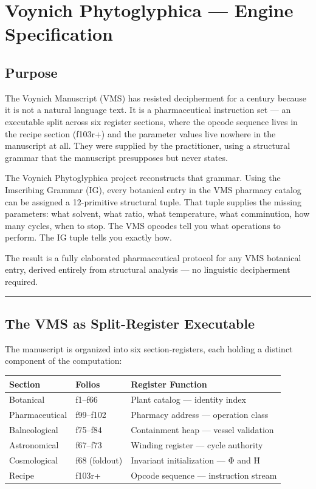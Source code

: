 \hypertarget{voynich-phytoglyphica-engine-specification}{%
\section{Voynich Phytoglyphica --- Engine
Specification}\label{voynich-phytoglyphica-engine-specification}}

\hypertarget{purpose}{%
\subsection{Purpose}\label{purpose}}

The Voynich Manuscript (VMS) has resisted decipherment for a century
because it is not a natural language text. It is a pharmaceutical
instruction set --- an executable split across six register sections,
where the opcode sequence lives in the recipe section (f103r+) and the
parameter values live nowhere in the manuscript at all. They were
supplied by the practitioner, using a structural grammar that the
manuscript presupposes but never states.

The Voynich Phytoglyphica project reconstructs that grammar. Using the
Imscribing Grammar (IG), every botanical entry in the VMS pharmacy
catalog can be assigned a 12-primitive structural tuple. That tuple
supplies the missing parameters: what solvent, what ratio, what
temperature, what comminution, how many cycles, when to stop. The VMS
opcodes tell you what operations to perform. The IG tuple tells you
exactly how.

The result is a fully elaborated pharmaceutical protocol for any VMS
botanical entry, derived entirely from structural analysis --- no
linguistic decipherment required.

\begin{center}\rule{0.5\linewidth}{0.5pt}\end{center}

\hypertarget{the-vms-as-split-register-executable}{%
\subsection{The VMS as Split-Register
Executable}\label{the-vms-as-split-register-executable}}

The manuscript is organized into six section-registers, each holding a
distinct component of the computation:

\begin{longtable}[]{@{}lll@{}}
\toprule
Section & Folios & Register Function\tabularnewline
\midrule
\endhead
Botanical & f1--f66 & Plant catalog --- identity index\tabularnewline
Pharmaceutical & f99--f102 & Pharmacy address --- operation
class\tabularnewline
Balneological & f75--f84 & Containment heap --- vessel
validation\tabularnewline
Astronomical & f67--f73 & Winding register --- cycle
authority\tabularnewline
Cosmological & f68 (foldout) & Invariant initialization --- Φ and
Ħ\tabularnewline
Recipe & f103r+ & Opcode sequence --- instruction stream\tabularnewline
\bottomrule
\end{longtable}

